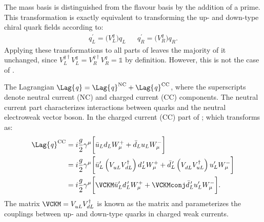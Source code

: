 The mass basis is distinguished from the flavour basis by the addition of a prime.
This transformation is exactly equivalent to transforming the up- and
down-type chiral quark fields according to:
\begin{align}
  q_L^\prime = \big(V_L^q\big)q_{L}^{} &&
  q_R^\prime = \big(V_R^q\big)q_{R}^{}.
\end{align}
Applying these transformations to all parts of  leaves the majority of it unchanged, since
$V_{L}^{q\dagger} V_{L}^{q} = V_{R}^{q\dagger} V_{R}^{q} = \mathds{1}$ by definition.
However, this is not the case of .

The Lagrangian $\Lag{\it q}=\Lag{\it q}^\mathrm{NC}+\Lag{\it q}^\mathrm{CC}$, where the
superscripts denote neutral current (NC) and charged current (CC) components.
The neutral current part characterizes interactions between quarks and the neutral electroweak
vector boson.
In the charged current (CC) part of ; which transforms as:
\begin{align}
  \Lag{\it q}^\mathrm{CC}
  &= i\frac{g}{2}\gamma^\mu
  \bigg[\bar u_Ld_LW^+_\mu + \bar d_Lu_LW^-_\mu
  \bigg]  \nonumber\\
  &= i\frac{g}{2}\gamma^\mu
  \bigg[
    \bar u_L^\prime\left(V_{uL}^{\phantom{\dagger}}V_{dL}^\dagger\right)d_L^{\,\prime} W^+_\mu +
    \bar d_L^{\,\prime}\left(V_{dL}^{\phantom{\dagger}}V_{uL}^\dagger\right)u_L^\prime W^-_\mu
  \bigg]  \nonumber\\
  &= i\frac{g}{2}\gamma^\mu
  \bigg[
    \VCKM\bar u_L^\prime d_L^{\,\prime} W^+_\mu +
    \VCKMconj\bar d_L^{\,\prime} u_L^\prime W^-_\mu
  \bigg].
\end{align}
The matrix $\VCKM=V^{\phantom{\dagger}}_{uL}V_{dL}^\dagger$ is known as the \ckm
matrix and parameterizes the couplings between up- and down-type quarks in charged weak currents.



